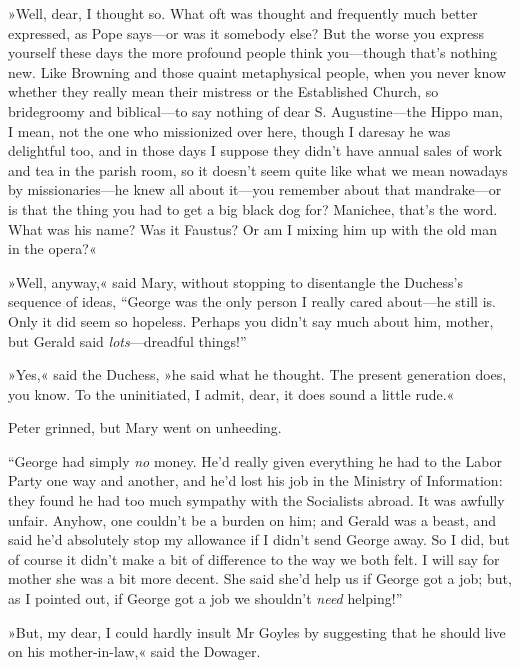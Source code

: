 »Well, dear, I thought so. What oft was thought and frequently much better expressed, as Pope says\allowbreak---\allowbreak or was it somebody else? But the worse you express yourself these days the more profound people think you\allowbreak---\allowbreak though that's nothing new. Like Browning and those quaint metaphysical people, when you never know whether they really mean their mistress or the Established Church, so bridegroomy and biblical\allowbreak---\allowbreak to say nothing of dear S. Augustine\allowbreak---\allowbreak the Hippo man, I mean, not the one who missionized over here, though I daresay he was delightful too, and in those days I suppose they didn't have annual sales of work and tea in the parish room, so it doesn't seem quite like what we mean nowadays by missionaries\allowbreak---\allowbreak he knew all about it\allowbreak---\allowbreak you remember about that mandrake\allowbreak---\allowbreak or is that the thing you had to get a big black dog for?  Manichee, that's the word. What was his name? Was it Faustus? Or am I mixing him up with the old man in the opera?«

»Well, anyway,« said Mary, without stopping to disentangle the Duchess's sequence of ideas, \enquote{George was the only person I really cared about\allowbreak---\allowbreak he still is. Only it did seem so hopeless. Perhaps you didn't say much about him, mother, but Gerald said \textit{lots}---dreadful things!}

»Yes,« said the Duchess, »he said what he thought. The present generation does, you know. To the uninitiated, I admit, dear, it does sound a little rude.«

Peter grinned, but Mary went on unheeding.

\enquote{George had simply \textit{no} money. He'd really given everything he had to the Labor Party one way and another, and he'd lost his job in the Ministry of Information: they found he had too much sympathy with the Socialists abroad. It was awfully unfair. Anyhow, one couldn't be a burden on him; and Gerald was a beast, and said he'd absolutely stop my allowance if I didn't send George away. So I did, but of course it didn't make a bit of difference to the way we both felt. I will say for mother she was a bit more decent. She said she'd help us if George got a job; but, as I pointed out, if George got a job we shouldn't \textit{need} helping!}

»But, my dear, I could hardly insult Mr Goyles by suggesting that he should live on his mother-in-law,« said the Dowager.

